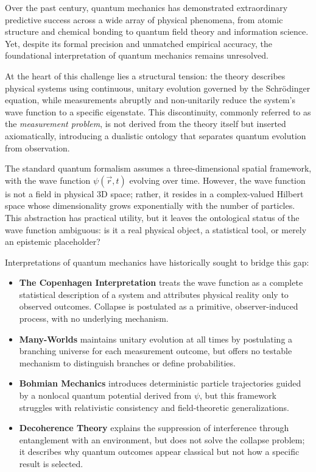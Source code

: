 \documentclass[12pt]{article}
\begin{document}
Over the past century, quantum mechanics has demonstrated extraordinary predictive success across a wide array of physical phenomena, from atomic structure and chemical bonding to quantum field theory and information science. Yet, despite its formal precision and unmatched empirical accuracy, the foundational interpretation of quantum mechanics remains unresolved.

At the heart of this challenge lies a structural tension: the theory describes physical systems using continuous, unitary evolution governed by the Schrödinger equation, while measurements abruptly and non-unitarily reduce the system's wave function to a specific eigenstate. This discontinuity, commonly referred to as the \textit{measurement problem}, is not derived from the theory itself but inserted axiomatically, introducing a dualistic ontology that separates quantum evolution from observation.

The standard quantum formalism assumes a three-dimensional spatial framework, with the wave function $\psi(\vec{r}, t)$ evolving over time. However, the wave function is not a field in physical 3D space; rather, it resides in a complex-valued Hilbert space whose dimensionality grows exponentially with the number of particles. This abstraction has practical utility, but it leaves the ontological status of the wave function ambiguous: is it a real physical object, a statistical tool, or merely an epistemic placeholder?

Interpretations of quantum mechanics have historically sought to bridge this gap:
\begin{itemize}
  \item \textbf{The Copenhagen Interpretation} treats the wave function as a complete statistical description of a system and attributes physical reality only to observed outcomes. Collapse is postulated as a primitive, observer-induced process, with no underlying mechanism.
  \item \textbf{Many-Worlds} maintains unitary evolution at all times by postulating a branching universe for each measurement outcome, but offers no testable mechanism to distinguish branches or define probabilities.
  \item \textbf{Bohmian Mechanics} introduces deterministic particle trajectories guided by a nonlocal quantum potential derived from $\psi$, but this framework struggles with relativistic consistency and field-theoretic generalizations.
  \item \textbf{Decoherence Theory} explains the suppression of interference through entanglement with an environment, but does not solve the collapse problem; it describes why quantum outcomes appear classical but not how a specific result is selected.
\end{itemize}
\end{document}
